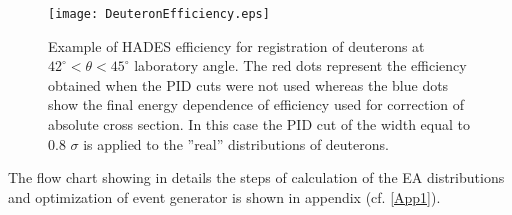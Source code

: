    \begin{figure}[!h]
        \centering
        \texttt{[image: DeuteronEfficiency.eps]}
        \caption{Example of HADES efficiency for registration of deuterons at $42^\circ < \theta< 45^\circ$
        laboratory angle. The red dots represent the efficiency obtained when the PID cuts were not
        used whereas the blue dots show the final energy dependence
        of efficiency used for correction of absolute cross section. In this case the PID cut of the width equal to 0.8 $\sigma$ 
        is applied to the ”real” distributions of deuterons.}
        \label{Deuteron_efficiency}
    \end{figure}
  

The flow chart showing in details the steps of calculation of the EA distributions and optimization of event generator is shown in appendix (cf. \ref{App1}). 




